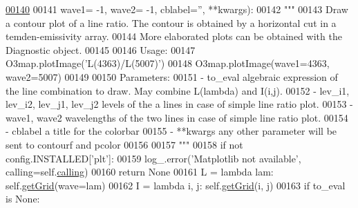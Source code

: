 \begin{DoxyCode}
\hypertarget{classpyneb_1_1core_1_1emis_grid_1_1_emis_grid_l00140}{}\hyperlink{classpyneb_1_1core_1_1emis_grid_1_1_emis_grid_a36dc2ce3b34d51d04c3244b61417a5d1}{00140} 
00141                   wave1= -1, wave2= -1, cblabel=\textcolor{stringliteral}{''}, **kwargs):
00142         \textcolor{stringliteral}{"""}
00143 \textcolor{stringliteral}{        Draw a contour plot of a line ratio. The contour is obtained by a horizontal cut in a
       temden-emissivity array.}
00144 \textcolor{stringliteral}{        More elaborated plots can be obtained with the Diagnostic object.}
00145 \textcolor{stringliteral}{        }
00146 \textcolor{stringliteral}{        Usage:}
00147 \textcolor{stringliteral}{            O3map.plotImage('L(4363)/L(5007)')}
00148 \textcolor{stringliteral}{            O3map.plotImage(wave1=4363, wave2=5007)}
00149 \textcolor{stringliteral}{            }
00150 \textcolor{stringliteral}{        Parameters:}
00151 \textcolor{stringliteral}{            - to\_eval                         algebraic expression of the line combination to draw. May
       combine L(lambda) and I(i,j).}
00152 \textcolor{stringliteral}{            - lev\_i1, lev\_i2, lev\_j1, lev\_j2  levels of the a lines in case of simple line ratio plot.}
00153 \textcolor{stringliteral}{            - wave1, wave2                    wavelengths of the two lines in case of simple line ratio
       plot.}
00154 \textcolor{stringliteral}{            - cblabel                         a title for the colorbar}
00155 \textcolor{stringliteral}{            - **kwargs                        any other parameter will be sent to contourf and pcolor}
00156 \textcolor{stringliteral}{}
00157 \textcolor{stringliteral}{        """}
00158         \textcolor{keywordflow}{if} \textcolor{keywordflow}{not} config.INSTALLED[\textcolor{stringliteral}{'plt'}]:
00159             log\_.error(\textcolor{stringliteral}{'Matplotlib not available'}, calling=self.\hyperlink{classpyneb_1_1core_1_1emis_grid_1_1_emis_grid_a19820878261ee98513e0b755e688453f}{calling})
00160             \textcolor{keywordflow}{return} \textcolor{keywordtype}{None}
00161         L = \textcolor{keyword}{lambda} lam: self.\hyperlink{classpyneb_1_1core_1_1emis_grid_1_1_emis_grid_af9a9219e5ddfcfd53c52466e2c2deb44}{getGrid}(wave=lam)
00162         I = \textcolor{keyword}{lambda} i, j: self.\hyperlink{classpyneb_1_1core_1_1emis_grid_1_1_emis_grid_af9a9219e5ddfcfd53c52466e2c2deb44}{getGrid}(i, j)
00163         \textcolor{keywordflow}{if} to\_eval \textcolor{keywordflow}{is} \textcolor{keywordtype}{None}:

\end{DoxyCode}
